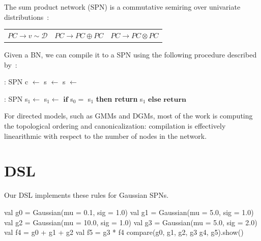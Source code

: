 \documentclass{article}
\begin{document}
The sum product network (SPN) is a commutative semiring over univariate distributions~\citep{friesen2016sum}:

\begin{center}
    \begin{tabular}{ccc}
        $PC \rightarrow v \sim \mathcal{D}$ &
        $PC \rightarrow PC \oplus PC$ &
        $PC \rightarrow PC \otimes PC$
    \end{tabular}
\end{center}

Given a BN, we can compile it to a SPN using the following procedure described by~\citet{butz2019sum}:


\begin{algorithm}
\begin{algorithmic}
: SPN
\State c $\leftarrow $
\State s $\leftarrow $
\State s $\leftarrow $
\State {}
\EndProcedure

: SPN
\State s$_1 \leftarrow$ 
\State s$_1 \leftarrow$ 
\State $\textbf{if } $s$_0 =$ s$_1$ \textbf{ then return } s$_1$
\State $\textbf{else return }$
\EndProcedure
\end{algorithmic}
\end{algorithm}

For directed models, such as GMMs and DGMs, most of the work is computing the topological ordering and canonicalization: compilation is effectively linearithmic with respect to the number of nodes in the network.

\section{DSL}

Our DSL implements these rules for Gaussian SPNs.

\begin{kotlinlisting}
val g0 = Gaussian(mu = 0.1,  sig = 1.0)
val g1 = Gaussian(mu = 5.0,  sig = 1.0)
val g2 = Gaussian(mu = 10.0, sig = 1.0)
val g3 = Gaussian(mu = 5.0,  sig = 2.0)
val f4 = g0 + g1 + g2
val f5 = g3 * f4
compare(g0, g1, g2, g3 g4, g5).show()
\end{kotlinlisting}
\end{document}
